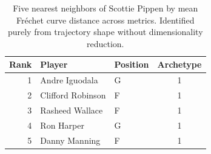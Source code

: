 \begin{table}[htbp]
  \centering\small
  \begin{tabular}{rllc}
    \toprule
    Rank & Player & Position & Archetype \\
    \midrule
    1 & Andre Iguodala & G & 1 \\
    2 & Clifford Robinson & F & 1 \\
    3 & Rasheed Wallace & F & 1 \\
    4 & Ron Harper & G & 1 \\
    5 & Danny Manning & F & 1 \\
    \bottomrule
  \end{tabular}
  \caption{Five nearest neighbors of Scottie Pippen by mean Fr\'{e}chet curve distance across metrics. Identified purely from trajectory shape without dimensionality reduction.}
  \label{tab:Scottie_Pippen_frechet_curve_neighbors}
\end{table}

